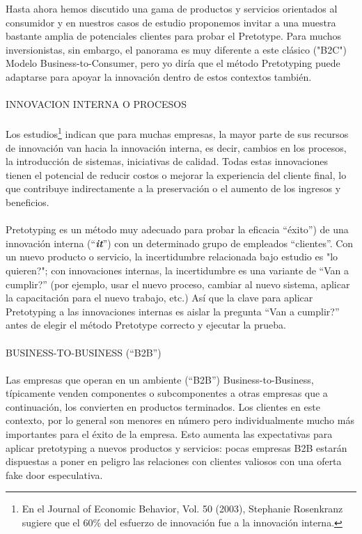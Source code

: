 \documentclass{article}
\begin{document}
Hasta ahora hemos discutido una gama de productos y servicios orientados al consumidor y en nuestros casos de estudio proponemos invitar a una muestra bastante amplia de potenciales clientes para probar el Pretotype. Para muchos inversionistas, sin embargo, el panorama es muy diferente a este cl\'asico ("B2C") Modelo Business-to-Consumer, pero yo dir\'ia que el m\'etodo Pretotyping puede adaptarse para apoyar la innovaci\'on dentro de estos contextos tambi\'en.
\\ \\
INNOVACION INTERNA O PROCESOS
\\ \\
Los estudios\footnote{En el Journal of Economic Behavior, Vol. 50 (2003), Stephanie Rosenkranz sugiere que el 60\% del esfuerzo de innovaci\'on fue a la innovaci\'on interna.} indican que para muchas empresas, la mayor parte de sus recursos de innovaci\'on van hacia la innovaci\'on interna, es decir, cambios en los procesos, la introducci\'on de sistemas, iniciativas de calidad. Todas estas innovaciones tienen el potencial de reducir costos o mejorar la experiencia del cliente final, lo que contribuye indirectamente a la preservaci\'on o el aumento de los ingresos y beneficios.
\\ \\
Pretotyping es un m\'etodo muy adecuado para probar la eficacia ``\'exito'') de una innovaci\'on interna (``\textbf{\textit{it}}'') con un determinado grupo de empleados ``clientes''. Con un nuevo producto o servicio, la incertidumbre relacionada bajo estudio es "lo quieren?"; con innovaciones internas, la incertidumbre es una variante de ``Van a cumplir?'' (por ejemplo, usar el nuevo proceso, cambiar al nuevo sistema, aplicar la capacitaci\'on para el nuevo trabajo, etc.) As\'i que la clave para aplicar Pretotyping a las innovaciones internas es aislar la pregunta ``Van a cumplir?'' antes de elegir el m\'etodo Pretotype correcto y ejecutar la prueba.
\\ \\
BUSINESS-TO-BUSINESS (``B2B'')
\\ \\
Las empresas que operan en un ambiente (``B2B'') Business-to-Business, t\'ipicamente venden componentes o subcomponentes a otras empresas que a continuaci\'on, los convierten en productos terminados. Los clientes en este contexto, por lo general son menores en n\'umero pero individualmente mucho m\'as importantes para el \'exito de la empresa. Esto aumenta las expectativas para aplicar pretotyping a nuevos productos y servicios: pocas empresas B2B estar\'an dispuestas a poner en peligro las relaciones con clientes valiosos con una oferta fake door especulativa.
\end{document}
